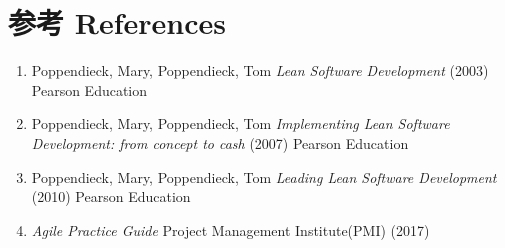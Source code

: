 \hypertarget{ux53c2ux8003-references}{%
\section{参考 References}\label{ux53c2ux8003-references}}

\begin{enumerate}
\tightlist
\item
  Poppendieck, Mary, Poppendieck, Tom \emph{Lean Software Development}
  (2003) Pearson Education\\
\item
  Poppendieck, Mary, Poppendieck, Tom \emph{Implementing Lean Software
  Development: from concept to cash} (2007) Pearson Education\\
\item
  Poppendieck, Mary, Poppendieck, Tom \emph{Leading Lean Software
  Development} (2010) Pearson Education\\
\item
  \emph{Agile Practice Guide} Project Management Institute(PMI) (2017)
\end{enumerate}



